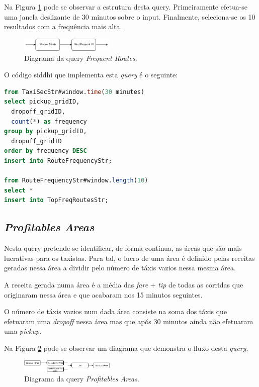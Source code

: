 \documentclass[article]{IEEEtran}
\begin{document}
Na Figura \ref{fig:frequentRoutesDiagram} pode se observar a estrutura desta query. Primeiramente efetua-se uma janela deslizante de 30 minutos sobre o input. Finalmente, seleciona-se os 10 resultados com a frequência mais alta.

\begin{figure}[hbtp]
    \centering
        \includegraphics[width=0.4\textwidth]{images/frequentRoutesDiagram}
    \caption{Diagrama da query \textit{Frequent Routes}.}
    \label{fig:frequentRoutesDiagram}
\end{figure}

O código siddhi que implementa esta \textit{query} é o seguinte:

\begin{lstlisting}[language=SQL]
from TaxiSecStr#window.time(30 minutes)
select pickup_gridID,
  dropoff_gridID,
  count(*) as frequency
group by pickup_gridID,
  dropoff_gridID
order by frequency DESC
insert into RouteFrequencyStr;

from RouteFrequencyStr#window.length(10)
select *
insert into TopFreqRoutesStr;
\end{lstlisting}

\subsection{\textit{Profitables Areas}}

Nesta query pretende-se identificar, de forma contínua, as áreas que são mais lucrativas para os taxistas. Para tal, o lucro de uma área é definido pelas receitas geradas nessa área a dividir pelo número de táxis vazios nessa mesma área.

A receita gerada numa área é a média das \textit{fare} + \textit{tip} de todas as corridas que originaram nessa área e que acabaram nos 15 minutos seguintes.

O número de táxis vazios num dada área consiste na soma dos táxis que efetuaram uma \textit{dropoff} nessa área mas que após 30 minutos ainda não efetuaram uma \textit{pickup}.

Na Figura \ref{fig:profitablesAreasDiagram} pode-se observar um diagrama que demonstra o fluxo desta \textit{query}.

\begin{figure}[hbtp]
    \centering
        \includegraphics[width=0.4\textwidth]{images/profitableAreasDiagram_v3}
    \caption{Diagrama da query \textit{Profitables Areas}.}
    \label{fig:profitablesAreasDiagram}
\end{figure}
\end{document}
